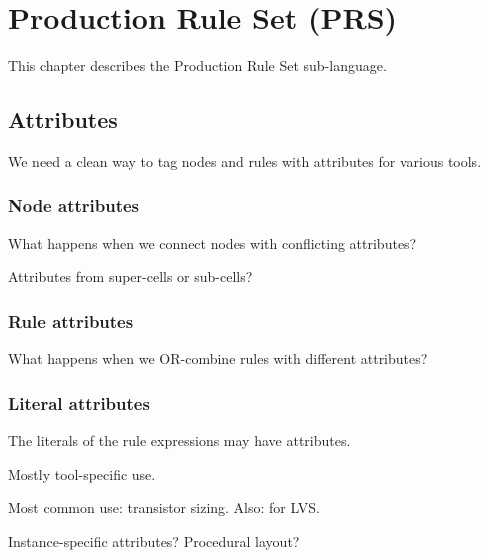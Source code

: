 

\chapter{Production Rule Set (PRS)}
\label{sec:prs}

This chapter describes the Production Rule Set sub-language.  

\section{Attributes}
\label{sec:prs:attrib}

We need a clean way to tag nodes and rules with attributes
for various tools.  

\subsection{Node attributes}
\label{sec:prs:attrib:node}

What happens when we connect nodes with conflicting attributes?

Attributes from super-cells or sub-cells?

\subsection{Rule attributes}
\label{sec:prs:attrib:rule}

What happens when we OR-combine rules with different attributes?

\subsection{Literal attributes}
\label{sec:prs:attrib:literal}

The literals of the rule expressions may have attributes.  

Mostly tool-specific use.

Most common use: transistor sizing.  
Also: for LVS.  

Instance-specific attributes?
Procedural layout?

